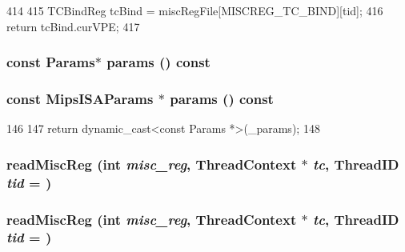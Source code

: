 \begin{DoxyCode}
414 {
415     TCBindReg tcBind = miscRegFile[MISCREG_TC_BIND][tid];
416     return tcBind.curVPE;
417 }
\end{DoxyCode}
\hypertarget{classMipsISA_1_1ISA_acd3c3feb78ae7a8f88fe0f110a718dff}{
\subsubsection[{params}]{\setlength{\rightskip}{0pt plus 5cm}const {\bf Params}$\ast$ params () const}}
\label{classMipsISA_1_1ISA_acd3c3feb78ae7a8f88fe0f110a718dff}
\hypertarget{classMipsISA_1_1ISA_a79943ccd051cbee11887e08c12997892}{
\subsubsection[{params}]{\setlength{\rightskip}{0pt plus 5cm}const MipsISAParams $\ast$ params () const}}
\label{classMipsISA_1_1ISA_a79943ccd051cbee11887e08c12997892}



\begin{DoxyCode}
146 {
147     return dynamic_cast<const Params *>(_params);
148 }
\end{DoxyCode}
\hypertarget{classMipsISA_1_1ISA_a81ac5a0c0d9b625997d7737f911743b1}{
\subsubsection[{readMiscReg}]{ readMiscReg (int {\em misc\_\-reg}, \/  {\bf ThreadContext} $\ast$ {\em tc}, \/  {\bf ThreadID} {\em tid} = {})}}
\label{classMipsISA_1_1ISA_a81ac5a0c0d9b625997d7737f911743b1}
\hypertarget{classMipsISA_1_1ISA_a81ac5a0c0d9b625997d7737f911743b1}{
\subsubsection[{readMiscReg}]{ readMiscReg (int {\em misc\_\-reg}, \/  {\bf ThreadContext} $\ast$ {\em tc}, \/  {\bf ThreadID} {\em tid} = {})}}
\label{classMipsISA_1_1ISA_a81ac5a0c0d9b625997d7737f911743b1}



